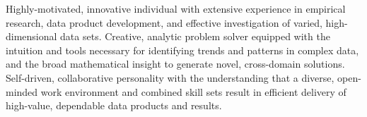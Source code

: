 \noindent Highly-motivated, innovative individual with extensive
experience in empirical research, data product development, and
effective investigation of varied, high-dimensional data sets.
Creative, analytic problem solver equipped with the intuition and tools
necessary 
for identifying trends and patterns in complex data, and the broad
mathematical insight to generate novel, cross-domain solutions.
Self-driven, collaborative personality with the understanding that a
diverse, open-minded work environment and combined skill sets
result in efficient delivery of high-value, dependable data products and
results.


